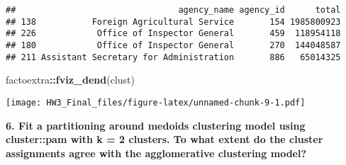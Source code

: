 \documentclass[]{article}
\newenvironment{Shaded}{\begin{snugshade}}{\end{snugshade}}
\newcommand{\DataTypeTok}[1]{\textcolor[rgb]{0.13,0.29,0.53}{#1}}
\newcommand{\DecValTok}[1]{\textcolor[rgb]{0.00,0.00,0.81}{#1}}
\newcommand{\KeywordTok}[1]{\textcolor[rgb]{0.13,0.29,0.53}{\textbf{#1}}}
\newcommand{\NormalTok}[1]{#1}
\newcommand{\OperatorTok}[1]{\textcolor[rgb]{0.81,0.36,0.00}{\textbf{#1}}}
\newcommand{\StringTok}[1]{\textcolor[rgb]{0.31,0.60,0.02}{#1}}
\begin{document}
\begin{verbatim}
##                                agency_name agency_id      total
## 138           Foreign Agricultural Service       154 1985800923
## 226            Office of Inspector General       459  118954118
## 180            Office of Inspector General       270  144048587
## 211 Assistant Secretary for Administration       886   65014325
\end{verbatim}

\begin{Shaded}
\begin{Highlighting}[]
\NormalTok{factoextra}\OperatorTok{::}\KeywordTok{fviz_dend}\NormalTok{(clust)}
\end{Highlighting}
\end{Shaded}

\texttt{[image: HW3\_Final\_files/figure-latex/unnamed-chunk-9-1.pdf]}

\textbf{6. Fit a partitioning around medoids clustering model using
cluster::pam with k = 2 clusters. To what extent do the cluster
assignments agree with the agglomerative clustering model?}

\begin{Shaded}
\end{Shaded}
\end{document}
